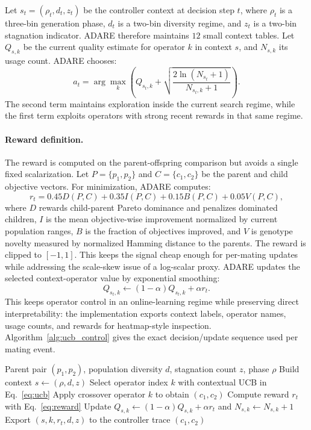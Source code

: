\documentclass[preprint,12pt]{elsarticle}
\begin{document}
Let $s_t=(\rho_t,d_t,z_t)$ be the controller context at decision step $t$, where $\rho_t$ is a three-bin generation phase, $d_t$ is a two-bin diversity regime, and $z_t$ is a two-bin stagnation indicator. ADARE therefore maintains $12$ small context tables. Let $Q_{s,k}$ be the current quality estimate for operator $k$ in context $s$, and $N_{s,k}$ its usage count. ADARE chooses:
\begin{equation}
\label{eq:ucb}
a_t = \arg\max_k \left( Q_{s_t,k} + \sqrt{\frac{2 \ln (N_{s_t}+1)}{N_{s_t,k} + 1}} \right).
\end{equation}
The second term maintains exploration inside the current search regime, while the first term exploits operators with strong recent rewards in that same regime.

\paragraph{Reward definition.}
The reward is computed on the parent-offspring comparison but avoids a single fixed scalarization. Let $P=\{p_1,p_2\}$ and $C=\{c_1,c_2\}$ be the parent and child objective vectors. For minimization, ADARE computes:
\begin{equation}
\label{eq:reward}
r_t =
0.45D(P,C) + 0.35I(P,C) + 0.15B(P,C) + 0.05V(P,C),
\end{equation}
where $D$ rewards child-parent Pareto dominance and penalizes dominated children, $I$ is the mean objective-wise improvement normalized by current population ranges, $B$ is the fraction of objectives improved, and $V$ is genotype novelty measured by normalized Hamming distance to the parents. The reward is clipped to $[-1,1]$. This keeps the signal cheap enough for per-mating updates while addressing the scale-skew issue of a log-scalar proxy. ADARE updates the selected context-operator value by exponential smoothing:
\begin{equation}
Q_{s_t,k} \leftarrow (1-\alpha)Q_{s_t,k} + \alpha r_t.
\end{equation}
This keeps operator control in an online-learning regime while preserving direct interpretability: the implementation exports context labels, operator names, usage counts, and rewards for heatmap-style inspection. Algorithm~\ref{alg:ucb_control} gives the exact decision/update sequence used per mating event.

\begin{algorithm}[H]
\caption{ADARE Pareto-Contextual UCB Crossover Control}
\label{alg:ucb_control}
\small
\begin{algorithmic}[1]
\Require Parent pair $(p_1,p_2)$, population diversity $d$, stagnation count $z$, phase $\rho$
\State Build context $s \gets (\rho,d,z)$
\State Select operator index $k$ with contextual UCB in Eq.~\eqref{eq:ucb}
\State Apply crossover operator $k$ to obtain $(c_1,c_2)$
\State Compute reward $r_t$ with Eq.~\eqref{eq:reward}
\State Update $Q_{s,k} \leftarrow (1-\alpha)Q_{s,k} + \alpha r_t$ and $N_{s,k} \leftarrow N_{s,k} + 1$
\State Export $(s,k,r_t,d,z)$ to the controller trace
\State \Return $(c_1,c_2)$
\end{algorithmic}
\end{algorithm}
\end{document}
